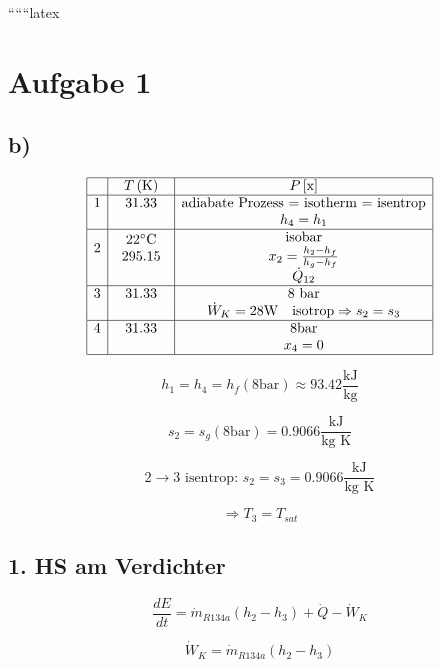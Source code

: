 
``````latex


\section*{Aufgabe 1}

\subsection*{b)}

\[
\begin{array}{|c|c|c|}
\hline
 & T \left( \text{K} \right) & P \left[ \text{x} \right] \\
\hline
1 & 31.33 & \text{adiabate Prozess = isotherm = isentrop} \\
 & & h_4 = h_1 \\
\hline
2 & \begin{array}{c} 22^\circ \text{C} \\ 295.15 \end{array} & \begin{array}{c} \text{isobar} \\ x_2 = \frac{h_2 - h_f}{h_g - h_f} \end{array} \\
 & & \dot{Q}_{12} \\
\hline
3 & 31.33 & \text{8 bar} \\
 & & \dot{W}_K = 28 \text{W} \quad \text{isotrop} \Rightarrow s_2 = s_3 \\
\hline
4 & 31.33 & 8 \text{bar} \\
 & & x_4 = 0 \\
\hline
\end{array}
\]

\[
h_1 = h_4 = h_f (8 \text{bar}) \approx 93.42 \frac{\text{kJ}}{\text{kg}}
\]

\[
s_2 = s_g (8 \text{bar}) = 0.9066 \frac{\text{kJ}}{\text{kg K}}
\]

\[
2 \rightarrow 3 \text{ isentrop: } s_2 = s_3 = 0.9066 \frac{\text{kJ}}{\text{kg K}}
\]

\[
\Rightarrow T_3 = T_{sat}
\]

\subsection*{1. HS am Verdichter}

\[
\frac{dE}{dt} = \dot{m}_{R134a} (h_2 - h_3) + \dot{Q} - \dot{W}_K
\]

\[
\dot{W}_K = \dot{m}_{R134a} (h_2 - h_3)
\]

